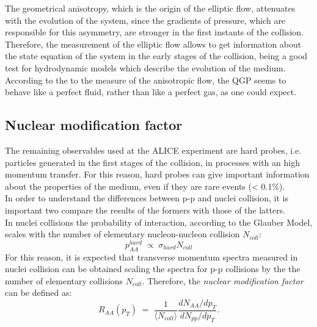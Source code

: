 The geometrical anisotropy, which is the origin of the elliptic flow, attenuates with the evolution of the system, since the gradients of pressure, which are responsible for this asymmetry, are stronger in the first instants of the collision. Therefore, the measurement of the elliptic flow allows to get information about the state equation of the system in the early stages of the collision, being a good test for hydrodynamic models which describe the evolution of the medium. According to the to the measure of the anisotropic flow, the QGP seems to behave like a perfect fluid, rather than like a perfect gas, as one could expect.\\
\subsection{Nuclear modification factor}
The remaining observables used at the ALICE experiment are hard probes, i.e. particles generated in the first stages of the collision, in processes with an high momentum transfer. For this reason, hard probes can give important information about the properties of the medium, even if they are rare events (< 0.1\%).\\
In order to understand the differences between p-p and nuclei collision, it is important two compare the results of the formers with those of the latters.\\
In nuclei collisions the probability of interaction, according to the Glauber Model, scales with the number of elementary nucleon-nucleon collision $N_{coll}$:
\begin{equation}
 p_{AA}^{hard}\;\propto\;\sigma_{hard}N_{coll}
\end{equation}
For this reason, it is expected that transverse momentum spectra measured in nuclei collision can be obtained scaling the spectra for p-p collisions by the the number of elementary collisions $N_{coll}$.
Therefore, the \textit{nuclear modification factor}  can be defined as:
\begin{equation}
 R_{AA}(p_{T})\;=\;\frac{1}{\langle N_{coll}\rangle}\frac{dN_{AA}/dp_{T}}{dN_{pp}/dp_{T}}.
\end{equation}
